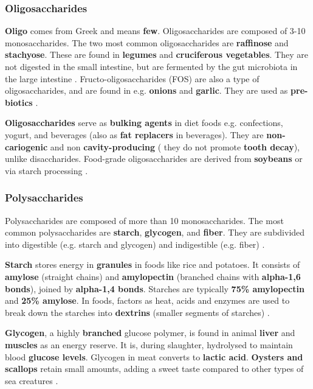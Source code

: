 \subsubsection*{Oligosaccharides}
\textbf{Oligo} comes from Greek and means \textbf{few}. Oligosaccharides are composed of 3-10 monosaccharides. The two most common oligosaccharides are \textbf{raffinose} and \textbf{stachyose}. These are found in \textbf{legumes} and \textbf{cruciferous vegetables}. They are not digested in the small intestine, but are fermented by the gut microbiota in the large intestine \cite*{BKR_02}. Fructo-oligosaccharides (FOS) are also a type of oligosaccharides, and are found in e.g. \textbf{onions} and \textbf{garlic}. They are used as \textbf{pre-biotics} \cite*{BKR_02}.


\textbf{Oligosaccharides} serve as \textbf{bulking agents} in diet foods e.g. confections, yogurt, and beverages (also as \textbf{fat replacers} in beverages). They are \textbf{non-cariogenic} and non \textbf{cavity-producing} ( they do not promote \textbf{tooth decay}), unlike disaccharides. Food-grade oligosaccharides are derived from \textbf{soybeans} or via starch processing \cite*{BKR_02}.

\subsubsection*{Polysaccharides}
Polysaccharides are composed of more than 10 monosaccharides. The most common polysaccharides are \textbf{starch}, \textbf{glycogen}, and \textbf{fiber}. They are subdivided into digestible (e.g. starch and glycogen) and indigestible (e.g. fiber) \cite*{BKR_02}.

\textbf{Starch} stores energy in \textbf{granules} in foods like rice and potatoes. It consists of \textbf{amylose} (straight chains) and \textbf{amylopectin} (branched chains with \textbf{alpha-1,6 bonds}), joined by \textbf{alpha-1,4 bonds}. Starches are typically \textbf{75\% amylopectin} and \textbf{25\% amylose}. In foods, factors as heat, acids and enzymes are used to break down the starches into \textbf{dextrins} (smaller segments of starches) \cite*{BKR_02}.

\textbf{Glycogen}, a highly \textbf{branched} glucose polymer, is found in animal \textbf{liver} and \textbf{muscles} as an energy reserve. It is, during slaughter, hydrolysed to maintain blood \textbf{glucose levels}. Glycogen in meat converts to \textbf{lactic acid}. \textbf{Oysters and scallops} retain small amounts, adding a sweet taste compared to other types of sea creatures \cite*{BKR_02}.

